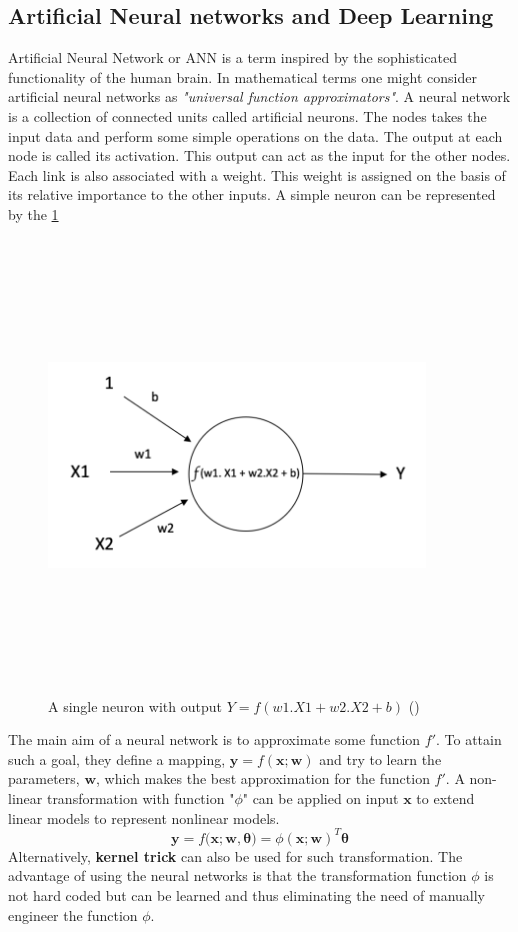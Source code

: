 \subsection{Artificial Neural networks and Deep Learning}
Artificial Neural Network or ANN is a term inspired by the sophisticated functionality of the human brain. In mathematical terms one might consider artificial neural networks as \textit{"universal function approximators"}.
A neural network is a collection of connected units called artificial neurons. The nodes takes the input data and perform some simple operations on the data. The output at each node is called its activation. This output can act as the input for the other nodes. Each link is also associated with a weight. This weight is assigned on the basis of its relative importance to the other inputs. A simple neuron can be represented by the \ref{fig:neuron}\\
\begin{figure}[H]
	\centering
	\includegraphics[width=10cm,height=12cm,keepaspectratio]{files/neuron.png}
	\caption{A single neuron with output $Y =f(w1.X1+w2.X2+b)$ (\cite{neuron})}
	\label{fig:neuron}
\end{figure}
The main aim of a neural network is to approximate some function $\mathit{f'}$. To attain such a goal, they define a mapping, $\mathbf{y} = f(\mathbf{x;w})$ and try to learn the parameters, $\mathbf{w}$, which makes the best approximation for the function $\mathit{f'}$. 
A non-linear transformation with function "$\phi$" can be applied on input $\mathbf{x}$ to extend linear models to represent nonlinear models. 
\begin{equation}
\mathbf{y} = f(\mathbf{x;w,\theta)} = \phi(\mathbf{x;w})^T \mathbf{\theta}
\end{equation}
Alternatively, \textbf{kernel trick} can also be used for such transformation. The advantage of using the neural networks is that the transformation function $\phi$ is not hard coded but can be learned and thus eliminating the need of manually engineer the function $\phi$. 	

